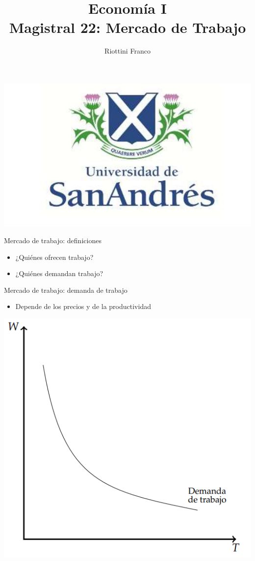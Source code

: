 \documentclass{beamer}
\title[Economía I]{Economía I \vspace{4mm}
\\ Magistral 22: Mercado de Trabajo}
\date{}
\author[Riottini]{Riottini Franco}
\institute[]{Universidad de San Andrés}
\begin{document}
\begin{frame}
\titlepage
\centering

\includegraphics[scale=0.2]{../Figures/logoUDESA.jpg} 
\end{frame}


\begin{frame}{Mercado de trabajo: definiciones}
    \begin{itemize}
        \item ¿Quiénes ofrecen trabajo?
        \item ¿Quiénes demandan trabajo?
    \end{itemize} 
\end{frame}


\begin{frame}{Mercado de trabajo: demanda de trabajo}
    \begin{itemize}
        \item Depende de los precios y de la productividad 
    \end{itemize}
    \centering
    \includegraphics[scale=0.6]{../Figures/C34.1.png} 
\end{frame}
\end{document}
